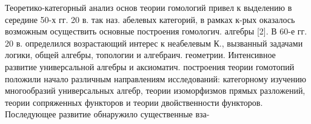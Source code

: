 \documentclass[10pt]{article}
\begin{document}
Теоретико-категорный анализ основ теории гомологий привел к выделению в середине 50-х гг. 20 в. так наз. абелевых категорий, в рамках к-рых оказалось возможным осуществить основные построения гомологич. алгебры [2]. В 60-е гг. 20 в. определился возрастающий интерес к неабелевым К., вызванный задачами логики, общей алгебры, топологии и алгебраич. геометрии. Интенсивное развитие универсальной алгебры и аксиоматич. построения теории гомотопий положили начало различным направлениям исследований: категорному изучению многообразий универсальных алгебр, теории изоморфизмов прямых разложений, теории сопряженных функторов и теории двойственности функторов. Последующее развитие обнаружило существенные вза-
\end{document}
